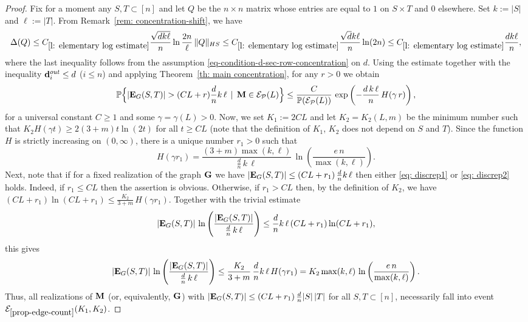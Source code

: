 \documentclass[12pt]{article}
\theoremstyle{definition}
\theoremstyle{plain}
\newcommand{\Event}{\mathcal{E}}
\def\nrangr{G}
\def\rangr{{\bf{}G}}
\def\ranmtx{{\bf{}M}}
\def\edg{{\bf E}_{\nrangr}}
\def\Prob{{\mathbb P}}
\def\OutDeg{{\bf d}^{out}}
\def\pvector{{\mathcal P}}
\begin{document}
\begin{proof}
Fix for a moment any $S, T\subset [n]$ and let
$Q$ be the $n\times n$ matrix whose entries are equal to $1$ on $S\times T$ and $0$ elsewhere. Set
$k:=\vert S\vert$ and $\ell:=\vert T\vert$. 
From Remark~\ref{rem: concentration-shift}, we have 
$$
\Delta(Q)\leq C_{\ref{l: elementary log estimate}}\frac{\sqrt{d k\ell}}{n}\ln\frac{2n}{\ell}\,\|Q\|_{HS}
\leq C_{\ref{l: elementary log estimate}} \frac{\sqrt{d} k\ell}{n}\ln(2n)\leq C_{\ref{l: elementary log estimate}} \frac{d k\ell}{n},
$$
where the last inequality follows from the assumption \eqref{eq-condition-d-sec-row-concentration} on $d$. 
Using the estimate together with the inequality $\OutDeg_i\leq d$ ($i\leq n$) and applying
Theorem~\ref{th: main concentration}, for any $r>0$ we obtain
\begin{equation}\label{eq-proof-dicrep}
\Prob\Big\{\vert\edg(S,T)\vert 
> (CL+ r) \frac{d}{n} k\, \ell\,\mid\,{\ranmtx}\in\Event_{\pvector}(L)
\Big\}\leq \frac{C}{\Prob(\Event_\pvector(L))}\, \exp\left(-\frac{d\, k\,\ell}{n}\, H(\gamma\, r)\right),
\end{equation}
for a universal constant $C\geq 1$ and some $\gamma=\gamma(L)>0$.
Now, we set $K_1:=2CL$ and let $K_2=K_2(L,m)$ be the minimum number such that $K_2 H(\gamma t)\geq 2(3+m)t\ln(2t)$
for all $t\geq CL$ (note that the definition of $K_1$, $K_2$ does not depend on $S$ and $T$).
Since the function $H$ is strictly increasing on $(0,\infty)$, there is a unique number $r_1>0$
such that
$$
H(\gamma r_1)= \frac{(3+m)\max(k,\ell)}{\frac{d}{n}\, k\, \ell}\, \ln\left(\frac{e\, n}{\max(k,\ell)}\right).
$$
Next, note that if for a fixed realization
of the graph $\rangr$ we have $\vert\edg(S,T)\vert \leq (CL+r_1)\, \frac{d}{n} k\, \ell$
then either \eqref{eq: discrep1} or \eqref{eq: discrep2} holds.
Indeed, 
if $r_1\leq CL$ then the assertion is obvious.
Otherwise,
if $r_1>CL$ then, by the definition of $K_2$, we have $(CL+r_1)\ln (CL+r_1)\leq \frac{K_2}{3+m}\,H(\gamma r_1)$.
Together with the trivial estimate
$$
\vert \edg(S,T)\vert\, \ln\left(\frac{\vert \edg(S,T)\vert}{ \frac{d}{n}\, 
k\, \ell}\right)\leq \frac{d}{n}k \, \ell\, (CL+r_1)\ln(CL+r_1),
$$
this gives
$$
\vert \edg(S,T)\vert\, \ln\left(\frac{\vert \edg(S,T)\vert}{ \frac{d}{n}\, 
k \, \ell}\right)\leq \frac{K_2}{3+m}\, \frac{d}{n}k \, \ell \, H(\gamma r_1)= K_2 \max(k,\ell)\,   \ln\left(\frac{e\, n}{\max(k,\ell)}\right).
$$
Thus, all realizations of $\ranmtx$ (or, equivalently, $\rangr$) with $\vert\edg(S,T)\vert \leq (CL+r_1)\, \frac{d}{n} |S|\, |T|$
for all $S,T\subset[n]$,
necessarily fall into event $\Event_{\ref{prop-edge-count}}(K_1,K_2)$.

\end{proof}
\end{document}
